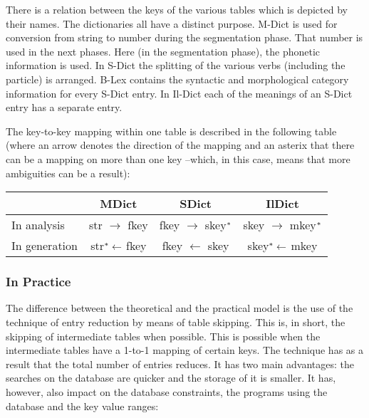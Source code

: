 There is a relation between the keys of the various tables which is depicted by 
their names. The dictionaries all have a distinct purpose. M-Dict is used for 
conversion from string to number during the segmentation phase. That 
number is used in the next phases. Here (in the segmentation phase), the 
phonetic information is used. In S-Dict the splitting of the various verbs 
(including 
the particle) is arranged. B-Lex contains the syntactic and morphological 
category information for every S-Dict entry. In Il-Dict each of the meanings of
an S-Dict entry has a separate entry. 
 
The key-to-key mapping within one table is described in the following table 
(where an arrow denotes the direction of the mapping and an asterix 
that there can be a mapping on more than one key --which, in this case, means 
that more ambiguities can be a result): 
 
\begin{center}
 \begin{tabular}{|l||c|c|c|}\hline
               & MDict                      
                       & SDict                          
                                & IlDict                               \\ \hline
 In analysis   & str $\rightarrow$ fkey     
                       & fkey $\rightarrow$ skey$^{\bf \ast}$ 
                                & skey $\rightarrow$ mkey$^{\bf \ast}$ \\
 In generation & str$^{\bf \ast} \leftarrow$ fkey 
                       & fkey $\leftarrow$ skey  
                                & skey$^{\bf \ast} \leftarrow$ mkey    \\ \hline
\end{tabular}
\end{center}
 
\subsubsection{In Practice}
 
The difference between the theoretical and the practical model is the use 
of the technique of entry reduction by means of table skipping. This is, in 
short, the skipping of intermediate tables when possible. This is 
possible when 
the intermediate tables have a 1-to-1 mapping of certain keys. The technique has
as a result that the total number of entries reduces. It has two main 
advantages: 
the searches on the database are quicker and the storage of it is smaller. It 
has, however, also impact on the database constraints, the programs using the 
database and the key value ranges:
 
